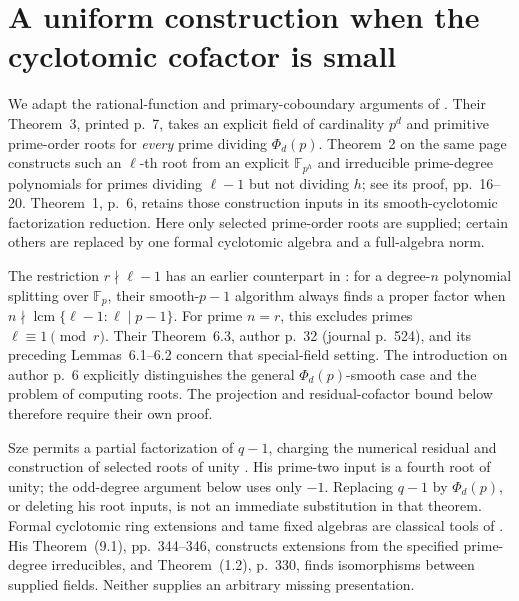 \documentclass[11pt]{article}
\theoremstyle{definition}
\theoremstyle{remark}
\begin{document}
\section{A uniform construction when the cyclotomic cofactor is small}
\label{sec:small-cofactor-lifting}

We adapt the rational-function and primary-coboundary arguments of
\citet[Proposition~(5.2), pp.~20--21; Sections~5.7 and~5.9--5.11,
pp.~22--23]{BGL2001}. Their Theorem~3, printed p.~7, takes an explicit
field of cardinality \(p^d\) and primitive prime-order roots for
\emph{every} prime dividing \(\Phi_d(p)\). Theorem~2 on the same page
constructs such an \(\ell\)-th root from an explicit
\(\mathbb F_{p^h}\) and irreducible prime-degree polynomials for
primes dividing \(\ell-1\) but not dividing \(h\); see its proof,
pp.~16--20. Theorem~1, p.~6, retains those construction inputs in
its smooth-cyclotomic factorization reduction. Here only selected
prime-order roots are supplied; certain others are replaced by one
formal cyclotomic algebra and a full-algebra norm.

The restriction \(r\nmid\ell-1\) has an earlier counterpart in
\citet[Theorem~1.5, author p.~6, journal p.~498]{IKRS2012}:
for a degree-\(n\) polynomial splitting over \(\mathbb F_p\),
their smooth-\(p-1\) algorithm always finds a proper factor when
\(n\nmid\operatorname{lcm}\{\ell-1:\ell\mid p-1\}\).
For prime \(n=r\), this excludes primes \(\ell\equiv1\pmod r\).
Their Theorem~6.3, author p.~32 (journal p.~524), and its preceding
Lemmas~6.1--6.2 concern that special-field setting. The introduction
on author p.~6 explicitly distinguishes the general
\(\Phi_d(p)\)-smooth case and the problem of computing roots.
The projection and residual-cofactor bound below therefore require
their own proof.

Sze permits a partial factorization of \(q-1\), charging the
numerical residual and construction of selected roots of unity
\citep[Definition~2.1 and Theorem~2.2, p.~4;
Lemma~3.21, pp.~17--18]{Sze2011}. His prime-two input is a fourth
root of unity; the odd-degree argument below uses only \(-1\).
Replacing \(q-1\) by \(\Phi_d(p)\), or deleting his root inputs,
is not an immediate substitution in that theorem.
Formal cyclotomic ring extensions and tame fixed algebras are
classical tools of \citet[Section~4, pp.~336--338;
Theorems~(5.1)--(5.2), pp.~338--340]{Lenstra1991}.
His Theorem~(9.1), pp.~344--346, constructs extensions from the
specified prime-degree irreducibles, and Theorem~(1.2), p.~330,
finds isomorphisms between supplied fields. Neither supplies an
arbitrary missing presentation.
\end{document}
